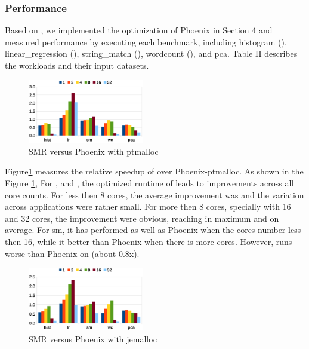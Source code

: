 \subsubsection{Performance}
Based on \myth, we implemented the optimization of Phoenix in Section 4 and measured \myds performance by executing each benchmark, including histogram (), linear\_regression (), string\_match (), wordcount (), and pca. 
Table II describes the workloads and their input datasets. 
\begin{figure}[!h!t]  
	\centering
	\includegraphics[width=0.45\textwidth]{eps/dmr_time_array.eps}
	\caption{SMR versus Phoenix with ptmalloc}
	\label{fig:smr:time:ptmalloc}
\end{figure}

Figure\ref{fig:smr:time:ptmalloc} measures the relative speedup of \myds over Phoenix-ptmalloc. 
As shown in the Figure \ref{fig:smr:time:ptmalloc}, For ,  and , the optimized runtime of \myds leads to improvements across all core counts.
For less then 8 cores, the average improvement was  and the variation across applications were rather small.
For more then 8 cores, specially with 16 and 32 cores, the improvement were obvious, reaching  in maximum and  on average.
For sm, it has performed as well as Phoenix when the cores number less then 16, while it better than Phoenix when there is more cores.
However, \myds runs worse than Phoenix on  (about 0.8x).
\begin{figure}[!h!t]  
	\centering
	\includegraphics[width=0.45\textwidth]{eps/dmr_time_jemalloc.eps}
	\caption{SMR versus Phoenix with jemalloc}
	\label{fig:smr:time:jemalloc}
\end{figure}

